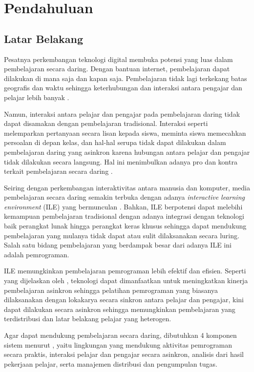 \chapter{Pendahuluan}

\section{Latar Belakang}
\label{sec:latarbelakang}

Pesatnya perkembangan teknologi digital membuka potensi yang luas dalam pembelajaran secara daring. Dengan bantuan internet, pembelajaran dapat dilakukan di mana saja dan kapan saja. Pembelajaran tidak lagi terkekang batas geografis dan waktu sehingga keterhubungan dan interaksi antara pengajar dan pelajar lebih banyak \parencite{choy2004interactive,keengwe2010towards,psotka2012ile}.

Namun, interaksi antara pelajar dan pengajar pada pembelajaran daring tidak dapat disamakan dengan pembelajaran tradisional. Interaksi seperti melemparkan pertanyaan secara lisan kepada siswa, meminta siswa memecahkan persoalan di depan kelas, dan hal-hal serupa tidak dapat dilakukan dalam pembelajaran daring yang asinkron karena hubungan antara pelajar dan pengajar tidak dilakukan secara langsung. Hal ini menimbulkan adanya pro dan kontra terkait pembelajaran secara daring \parencite{radovic2010advantages}.

Seiring dengan perkembangan interaktivitas antara manusia dan komputer, media pembelajaran secara daring semakin terbuka dengan adanya \textit{interactive learning environment} (ILE) yang bermunculan \parencite{psotka2012ile}. Bahkan, ILE berpotensi dapat melebihi kemampuan pembelajaran tradisional dengan adanya integrasi dengan teknologi baik perangkat lunak hingga perangkat keras khusus sehingga dapat mendukung pembelajaran yang mulanya tidak dapat atau sulit dilaksanakan secara luring. Salah satu bidang pembelajaran yang berdampak besar dari adanya ILE ini adalah pemrograman.

ILE memungkinkan pembelajaran pemrograman lebih efektif dan efisien. Seperti yang dijelaskan oleh \textcite{choy2004interactive}, teknologi dapat dimanfaatkan untuk meningkatkan kinerja pembelajaran asinkron sehingga pelatihan pemrograman yang biasanya dilaksanakan dengan lokakarya secara sinkron antara pelajar dan pengajar, kini dapat dilakukan secara asinkron sehingga memungkinkan pembelajaran yang terdistribusi dan latar belakang pelajar yang heterogen.

Agar dapat mendukung pembelajaran secara daring, dibutuhkan 4 komponen sistem menurut \textcite{choy2004interactive}, yaitu lingkungan yang mendukung aktivitas pemrograman secara praktis, interaksi pelajar dan pengajar secara asinkron, analisis dari hasil pekerjaan pelajar, serta manajemen distribusi dan pengumpulan tugas.

